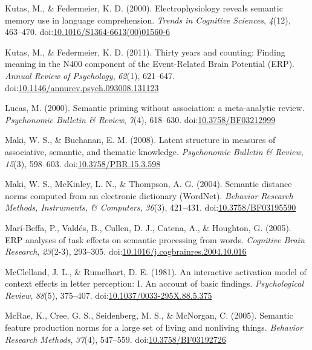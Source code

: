 \documentclass[english,man]{apa6}
\theoremstyle{definition}
\theoremstyle{definition}
\theoremstyle{definition}
\theoremstyle{remark}
\begin{document}
\hypertarget{ref-Kutas2000}{}
Kutas, M., \& Federmeier, K. D. (2000). Electrophysiology reveals
semantic memory use in language comprehension. \emph{Trends in Cognitive
Sciences}, \emph{4}(12), 463--470.
doi:\href{https://doi.org/10.1016/S1364-6613(00)01560-6}{10.1016/S1364-6613(00)01560-6}

\hypertarget{ref-Kutas2011}{}
Kutas, M., \& Federmeier, K. D. (2011). Thirty years and counting:
Finding meaning in the N400 component of the Event-Related Brain
Potential (ERP). \emph{Annual Review of Psychology}, \emph{62}(1),
621--647.
doi:\href{https://doi.org/10.1146/annurev.psych.093008.131123}{10.1146/annurev.psych.093008.131123}

\hypertarget{ref-Lucas2000}{}
Lucas, M. (2000). Semantic priming without association: a meta-analytic
review. \emph{Psychonomic Bulletin \& Review}, \emph{7}(4), 618--630.
doi:\href{https://doi.org/10.3758/BF03212999}{10.3758/BF03212999}

\hypertarget{ref-Maki2008}{}
Maki, W. S., \& Buchanan, E. M. (2008). Latent structure in measures of
associative, semantic, and thematic knowledge. \emph{Psychonomic
Bulletin \& Review}, \emph{15}(3), 598--603.
doi:\href{https://doi.org/10.3758/PBR.15.3.598}{10.3758/PBR.15.3.598}

\hypertarget{ref-Maki2004}{}
Maki, W. S., McKinley, L. N., \& Thompson, A. G. (2004). Semantic
distance norms computed from an electronic dictionary (WordNet).
\emph{Behavior Research Methods, Instruments, \& Computers},
\emph{36}(3), 421--431.
doi:\href{https://doi.org/10.3758/BF03195590}{10.3758/BF03195590}

\hypertarget{ref-Mari-Beffa2005}{}
Marí-Beffa, P., Valdés, B., Cullen, D. J., Catena, A., \& Houghton, G.
(2005). ERP analyses of task effects on semantic processing from words.
\emph{Cognitive Brain Research}, \emph{23}(2-3), 293--305.
doi:\href{https://doi.org/10.1016/j.cogbrainres.2004.10.016}{10.1016/j.cogbrainres.2004.10.016}

\hypertarget{ref-McClelland1981}{}
McClelland, J. L., \& Rumelhart, D. E. (1981). An interactive activation
model of context effects in letter perception: I. An account of basic
findings. \emph{Psychological Review}, \emph{88}(5), 375--407.
doi:\href{https://doi.org/10.1037/0033-295X.88.5.375}{10.1037/0033-295X.88.5.375}

\hypertarget{ref-McRae2005}{}
McRae, K., Cree, G. S., Seidenberg, M. S., \& McNorgan, C. (2005).
Semantic feature production norms for a large set of living and
nonliving things. \emph{Behavior Research Methods}, \emph{37}(4),
547--559.
doi:\href{https://doi.org/10.3758/BF03192726}{10.3758/BF03192726}
\end{document}
